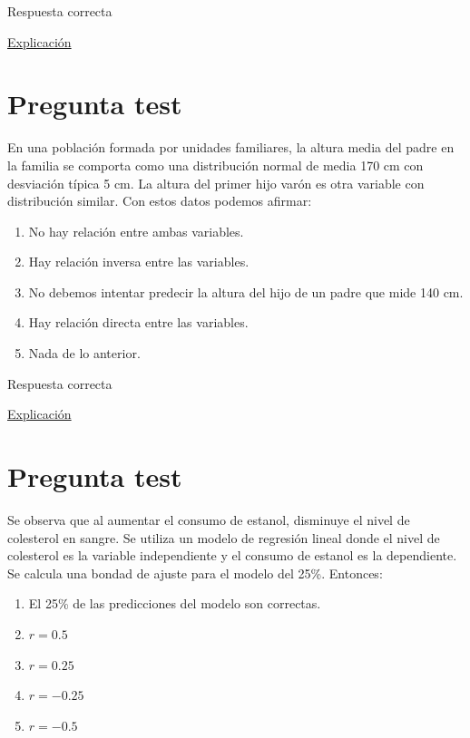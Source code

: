 \documentclass[
]{book}
\providecommand{\tightlist}{%
  \setlength{\itemsep}{0pt}\setlength{\parskip}{0pt}}
\begin{document}
Respuesta correcta

\href{https://www.cdc.gov/healthyweight/spanish/assessing/bmi/adult_bmi/index.html}{Explicación}

\hypertarget{pregunta-test-129}{%
\section{Pregunta test}\label{pregunta-test-129}}

En una población formada por unidades familiares, la altura media del padre en la familia se comporta como una distribución normal de media 170 cm con desviación típica 5 cm. La altura del primer hijo varón es otra variable con distribución similar. Con estos datos podemos afirmar:

\begin{enumerate}
\def\labelenumi{\alph{enumi})}
\tightlist
\item
  No hay relación entre ambas variables.
\item
  Hay relación inversa entre las variables.
\item
  No debemos intentar predecir la altura del hijo de un padre que mide 140 cm.
\item
  Hay relación directa entre las variables.
\item
  Nada de lo anterior.
\end{enumerate}

Respuesta correcta

\href{https://www.feedingthemachine.ai/regresion-lineal-y-los-outliers/}{Explicación}

\hypertarget{pregunta-test-130}{%
\section{Pregunta test}\label{pregunta-test-130}}

Se observa que al aumentar el consumo de estanol, disminuye el nivel de colesterol en sangre. Se utiliza un modelo de regresión lineal donde el nivel de colesterol es la variable independiente y el consumo de estanol es la dependiente. Se calcula una bondad de ajuste para el modelo del 25\%. Entonces:

\begin{enumerate}
\def\labelenumi{\alph{enumi})}
\tightlist
\item
  El 25\% de las predicciones del modelo son correctas.
\item
  \(r= 0.5\)
\item
  \(r= 0.25\)
\item
  \(r= -0.25\)
\item
  \(r= -0.5\)
\end{enumerate}
\end{document}
